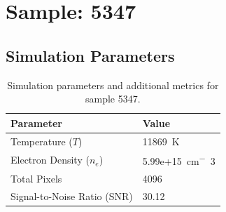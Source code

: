 \documentclass[a4paper,11pt]{article}
\begin{document}
\clearpage

\section{Sample: 5347}
\subsection{Simulation Parameters}
\begin{table}[h!]
    \centering
    \begin{tabular}{ll}
        \toprule
        \textbf{Parameter} & \textbf{Value} \\
        \midrule
        Temperature ($T$) & 11869 \,\si{K} \\
        Electron Density ($n_e$) & 5.99e+15 \,\si{cm^-3} \\
        Total Pixels & 4096 \\
        Signal-to-Noise Ratio (SNR) & 30.12 \\
        \bottomrule
    \end{tabular}
    \caption{Simulation parameters and additional metrics for sample 5347.}
    \label{tab:params_5347}
\end{table}
\end{document}
